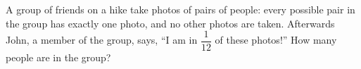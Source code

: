 A group of friends on a hike take photos of pairs of people: every possible pair in the group has exactly one photo, and no other photos are taken. Afterwards John, a member of the group, says, ``I am in $\dfrac{1}{12}$ of these photos!'' How many people are in the group?

